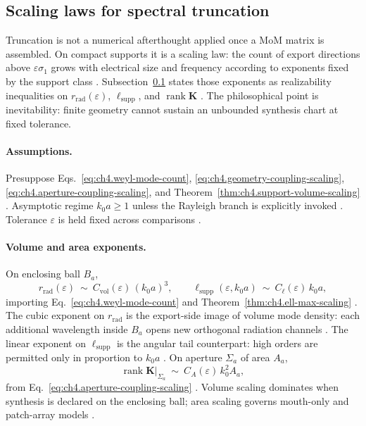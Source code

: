 ﻿\subsection{Scaling laws for spectral truncation}
\label{sec:ch462}

Truncation is not a numerical afterthought applied once a MoM matrix is assembled. On compact supports it is a scaling law: the count of
export directions above \(\varepsilon\sigma_{1}\) grows with electrical size and frequency according to exponents fixed by the support class
\cite{stratton1941,jackson1999,hansen1988}. Subsection~\ref{sec:ch462} states those exponents as realizability inequalities on
\(r_{\mathrm{rad}}(\varepsilon)\), \(\ell_{\mathrm{supp}}\), and \(\operatorname{rank}\mathbf{K}\) \cite{harrington2001,devaney2004}. The
philosophical point is inevitability: finite geometry cannot sustain an unbounded synthesis chart at fixed tolerance.

\paragraph{Assumptions.}
Presuppose Eqs.~\eqref{eq:ch4.weyl-mode-count}, \eqref{eq:ch4.geometry-coupling-scaling}, \eqref{eq:ch4.aperture-coupling-scaling}, and
Theorem~\ref{thm:ch4.support-volume-scaling} \cite{stratton1941,hansen1988,harrington2001}. Asymptotic regime \(k_{0}a\ge1\) unless the
Rayleigh branch is explicitly invoked \cite{jackson1999}. Tolerance \(\varepsilon\) is held fixed across comparisons \cite{devaney2004}.

\paragraph{Volume and area exponents.}
On enclosing ball \(B_{a}\),
\begin{equation}
\label{eq:ch4.truncation-volume-scaling}
r_{\mathrm{rad}}(\varepsilon)
\ \sim\
C_{\mathrm{vol}}(\varepsilon)\,(k_{0}a)^{3},
\qquad
\ell_{\mathrm{supp}}(\varepsilon,k_{0}a)
\ \sim\
C_{\ell}(\varepsilon)\,k_{0}a,
\end{equation}
importing Eq.~\eqref{eq:ch4.weyl-mode-count} and Theorem~\ref{thm:ch4.ell-max-scaling} \cite{stratton1941,jackson1999,hansen1988}. The cubic
exponent on \(r_{\mathrm{rad}}\) is the export-side image of volume mode density: each additional wavelength inside \(B_{a}\) opens new
orthogonal radiation channels \cite{harrington2001}. The linear exponent on \(\ell_{\mathrm{supp}}\) is the angular tail counterpart: high
orders are permitted only in proportion to \(k_{0}a\) \cite{hansen1988,devaney2004}. On aperture \(\Sigma_{a}\) of area \(A_{a}\),
\begin{equation}
\label{eq:ch4.truncation-area-scaling}
\operatorname{rank}\mathbf{K}\big|_{\Sigma_{a}}
\ \sim\
C_{A}(\varepsilon)\,k_{0}^{2}A_{a},
\end{equation}
from Eq.~\eqref{eq:ch4.aperture-coupling-scaling} \cite{collin2001,harrington2001,devaney2004}. Volume scaling dominates when synthesis is
declared on the enclosing ball; area scaling governs mouth-only and patch-array models \cite{stratton1941}.


